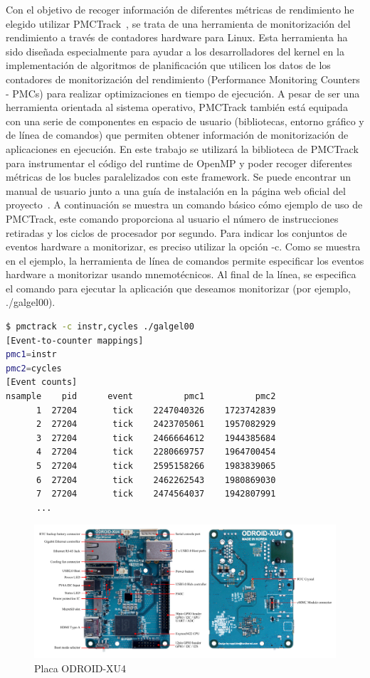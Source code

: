 Con el objetivo de recoger información de diferentes métricas de rendimiento he elegido utilizar PMCTrack~\cite{pmctrack}, se trata de una herramienta de monitorización del rendimiento a través de contadores hardware para Linux. Esta herramienta ha sido diseñada especialmente para ayudar a los desarrolladores del kernel en la implementación de algoritmos de planificación que utilicen los datos de los contadores de monitorización del rendimiento (Performance Monitoring Counters - PMCs) para realizar optimizaciones en tiempo de ejecución. A pesar de ser una herramienta orientada al sistema operativo, PMCTrack también está equipada con una serie de componentes en espacio de usuario (bibliotecas, entorno gráfico y de línea de comandos) que permiten obtener información de monitorización de aplicaciones en ejecución. En este trabajo se utilizará la biblioteca de PMCTrack para instrumentar el código del runtime de OpenMP y poder recoger diferentes métricas de los bucles paralelizados con este framework. Se puede encontrar un manual de usuario junto a una guía de instalación en la página web oficial del proyecto~\cite{pmc-userguide}. A continuación se muestra un comando básico cómo ejemplo de uso de PMCTrack, este comando proporciona al usuario el número de instrucciones retiradas y los ciclos de procesador por segundo. Para indicar los conjuntos de eventos hardware a monitorizar, es preciso utilizar la opción -c. Como se muestra en el ejemplo, la herramienta de línea de comandos permite especificar los eventos hardware a monitorizar usando mnemotécnicos. Al final de la línea, se especifica el comando para ejecutar la aplicación que deseamos monitorizar (por ejemplo, ./galgel00).

\begin{lstlisting}[frame=none,language=bash,basicstyle=\tt\scriptsize]
$ pmctrack -c instr,cycles ./galgel00 
[Event-to-counter mappings]
pmc1=instr
pmc2=cycles
[Event counts]
nsample    pid      event          pmc1          pmc2
      1  27204       tick    2247040326    1723742839 
      2  27204       tick    2423705061    1957082929 
      3  27204       tick    2466664612    1944385684 
      4  27204       tick    2280669757    1964700454 
      5  27204       tick    2595158266    1983839065 
      6  27204       tick    2462262543    1980869030 
      7  27204       tick    2474564037    1942807991 
      ...
\end{lstlisting}

\begin{figure}[tbp]
    \centering
    \includegraphics[width=1\textwidth]{foto_placa_XU4.png}
    \caption{Placa ODROID-XU4}
    \label{fig:fotoPlacaXU4}
\end{figure}


